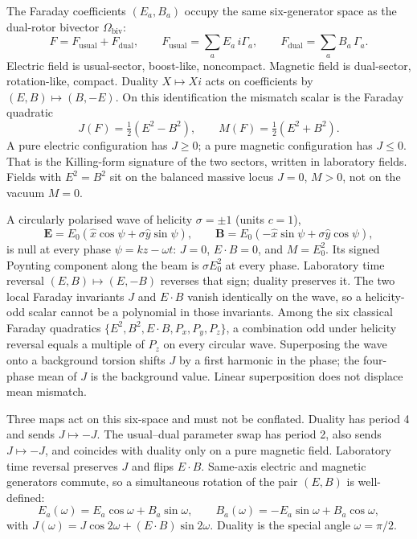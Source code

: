 \documentclass[a4paper]{article}
\begin{document}
The Faraday coefficients $(E_a,B_a)$ occupy the same six-generator space as the dual-rotor bivector $\Omega_{\mathrm{biv}}$:
\begin{equation}
\label{eq:faraday-split}
F = F_{\mathrm{usual}}+F_{\mathrm{dual}},\qquad
F_{\mathrm{usual}}=\sum_a E_a\,i\Gamma_a,\qquad
F_{\mathrm{dual}}=\sum_a B_a\,\Gamma_a.
\end{equation}
Electric field is usual-sector, boost-like, noncompact. Magnetic field is dual-sector, rotation-like, compact. Duality $X\mapsto Xi$ acts on coefficients by $(E,B)\mapsto(B,-E)$. On this identification the mismatch scalar is the Faraday quadratic
\[
J(F)=\tfrac12(E^2-B^2),\qquad M(F)=\tfrac12(E^2+B^2).
\]
A pure electric configuration has $J\ge 0$; a pure magnetic configuration has $J\le 0$. That is the Killing-form signature of the two sectors, written in laboratory fields. Fields with $E^2=B^2$ sit on the balanced massive locus $J=0$, $M>0$, not on the vacuum $M=0$.

A circularly polarised wave of helicity $\sigma=\pm 1$ (units $c=1$),
\[
\mathbf{E}=E_0(\hat{x}\cos\psi+\sigma\hat{y}\sin\psi),\qquad
\mathbf{B}=E_0(-\hat{x}\sin\psi+\sigma\hat{y}\cos\psi),
\]
is null at every phase $\psi=kz-\omega t$: $J=0$, $E\cdot B=0$, and $M=E_0^2$. Its signed Poynting component along the beam is $\sigma E_0^2$ at every phase. Laboratory time reversal $(E,B)\mapsto(E,-B)$ reverses that sign; duality preserves it. The two local Faraday invariants $J$ and $E\cdot B$ vanish identically on the wave, so a helicity-odd scalar cannot be a polynomial in those invariants. Among the six classical Faraday quadratics $\{E^2,B^2,E\cdot B,P_x,P_y,P_z\}$, a combination odd under helicity reversal equals a multiple of $P_z$ on every circular wave. Superposing the wave onto a background torsion shifts $J$ by a first harmonic in the phase; the four-phase mean of $J$ is the background value. Linear superposition does not displace mean mismatch.

Three maps act on this six-space and must not be conflated. Duality has period 4 and sends $J\mapsto -J$. The usual--dual parameter swap has period 2, also sends $J\mapsto -J$, and coincides with duality only on a pure magnetic field. Laboratory time reversal preserves $J$ and flips $E\cdot B$. Same-axis electric and magnetic generators commute, so a simultaneous rotation of the pair $(E,B)$ is well-defined:
\[
E_a(\omega)=E_a\cos\omega+B_a\sin\omega,\qquad
B_a(\omega)=-E_a\sin\omega+B_a\cos\omega,
\]
with $J(\omega)=J\cos 2\omega+(E\cdot B)\sin 2\omega$. Duality is the special angle $\omega=\pi/2$.
\end{document}
